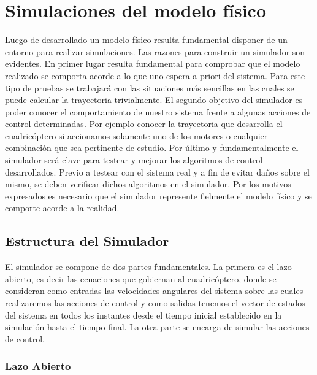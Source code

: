 \documentclass[main]{subfiles}
\begin{document}
\chapter{Simulaciones del modelo f\'isico}
\label{chap:simulador}

Luego de desarrollado un modelo f\'isico resulta fundamental disponer de un entorno para realizar simulaciones. Las razones para construir un simulador son evidentes. En primer lugar resulta fundamental para comprobar que el modelo realizado se comporta acorde a lo que uno espera a priori del sistema. Para este tipo de pruebas se trabajar\'a con las situaciones m\'as sencillas en las cuales se puede calcular la trayectoria trivialmente. El segundo objetivo del simulador es poder conocer el comportamiento de nuestro sistema frente a algunas acciones de control determinadas. Por ejemplo conocer la trayectoria que desarrolla el cuadric\'optero si accionamos solamente uno de los motores o cualquier combinaci\'on que sea pertinente de estudio. Por \'ultimo y fundamentalmente el simulador ser\'a clave para testear y mejorar los algoritmos de control desarrollados. Previo a testear con el sistema real y a fin de evitar da\~nos sobre el mismo, se deben verificar dichos algoritmos en el simulador. Por los motivos expresados es necesario que el simulador represente fielmente el modelo f\'isico y se comporte acorde a la realidad. \\

\section{Estructura del Simulador}


El simulador se compone de dos partes fundamentales. La primera es el lazo abierto, es decir las ecuaciones que gobiernan al cuadric\'optero, donde se consideran como entradas las velocidades angulares del sistema sobre las cuales realizaremos las acciones de control y como salidas tenemos el vector de estados del sistema en todos los instantes desde el tiempo inicial establecido en la simulaci\'on hasta el tiempo final. La otra parte se encarga de simular las acciones de control.

\subsection{Lazo Abierto}
\end{document}
